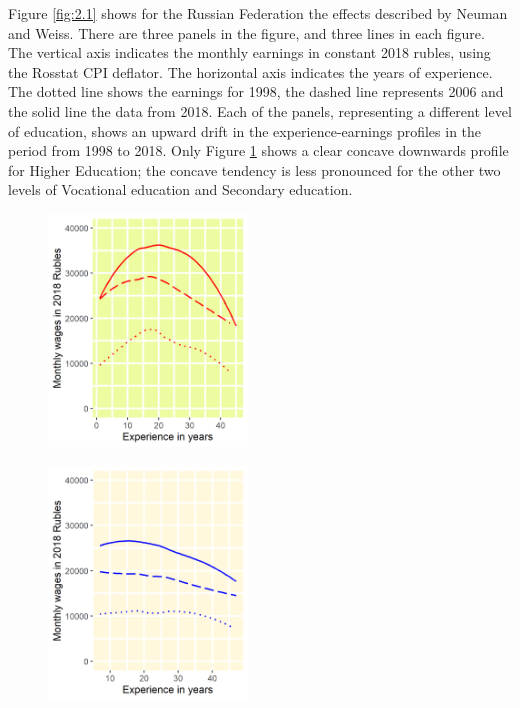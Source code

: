 \documentclass[12pt,a4paper]{article}
\numberwithin{equation}{section}
\begin{document}
Figure \ref{fig:2.1} shows for the Russian Federation the effects described by Neuman and Weiss. There are three panels in the figure, and three lines in each figure. The vertical axis indicates the monthly earnings in constant 2018 rubles, using the Rosstat CPI deflator. The horizontal axis indicates the years of experience. The dotted line shows the earnings for 1998, the dashed line represents 2006 and the solid line the data from 2018. Each of the panels, representing a different level of education, shows an upward drift in the experience-earnings profiles in the period from 1998 to 2018. Only Figure \ref{fig:2.1a} shows a clear concave downwards profile for Higher Education; the concave tendency is less pronounced for the other two levels of Vocational education and Secondary education.
	
	\begin{figure}[H]
		\begin{minipage}[b]{.3\linewidth}
			\centering
			\hspace*{-0.7in}
			\includegraphics[width=150pt]{dp01_he.png}
			\label{fig:2.1a}
		\end{minipage}
		\hfill
		\begin{minipage}[b]{.3\linewidth}
			\centering
			\hspace*{-0.7in}
			\includegraphics[width=150pt]{dp01_ve.png}

\end{minipage}
\end{figure}
\end{document}
